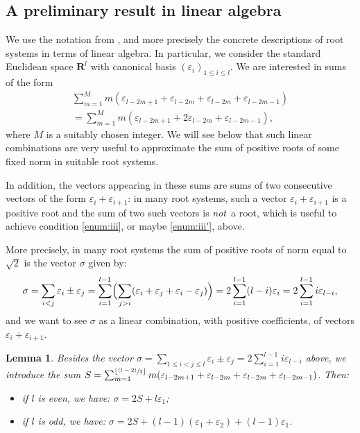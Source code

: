 \documentclass[JEP,XML,SOM,Unicode,published]{cedram}
\newcommand{\psfrac}[2]{\sfrac{(#1)}{#2}}
\newcommand{\RR}{\mathbf{R}}
\theoremstyle{plain}
\newtheorem{lemma}[equation]{Lemma}
\theoremstyle{remark}
\theoremstyle{definition}
\begin{document}
\subsection{A preliminary result in linear algebra}
\label{ss - linear algebra}
We use the notation from \cite[Planches]{BBK-Lie-4to6}, and more precisely the concrete descriptions of root systems in terms of linear algebra.
In particular, we consider the standard Euclidean space $\RR^l$ with canonical basis $(\varepsilon_i)_{1 \leqslant i \leqslant l}$.
We are interested in sums of the form\vspace*{-3pt}
\begin{multline*}
\sum_{m=1}^M m(\varepsilon_{l-2m+1} + \varepsilon_{l-2m} + \varepsilon_{l-2m} + \varepsilon_{l-2m-1})\\[-5pt]
= \sum_{m=1}^M m(\varepsilon_{l-2m+1} + 2\varepsilon_{l-2m} + \varepsilon_{l-2m-1}),
\end{multline*}
where $M$ is a suitably chosen integer.
We will see below that such linear combinations are very useful to approximate the sum of positive roots of some fixed norm in suitable root systems.

In addition, the vectors appearing in these sums are sums of two consecutive vectors of the form $\varepsilon_{i}+\varepsilon_{i+1}$: in many root systems, such a vector $\varepsilon_{i}+\varepsilon_{i+1}$ is a positive root and the sum of two such vectors is \emph{not}~a root, which is useful to achieve condition \eqref{enum:iii}, or maybe \eqref{enum:iii'}, above.

More precisely, in many root systems the sum of positive roots of norm equal to~$\sqrt{2}$ is the vector $\sigma$ given by:\vspace*{-3pt}
\[
\sigma =
\sum_{i<j} \varepsilon_i \pm \varepsilon_j
= \sum_{i=1}^{l-1} \Bigl(\sum_{j>i} (\varepsilon_i + \varepsilon_j + \varepsilon_i - \varepsilon_j) \Bigr)
= 2 \sum_{i=1}^{l-1} (l-i) \varepsilon_i
= 2 \sum_{i=1}^{l-1} i \varepsilon_{l-i},
\]
and we want to see $\sigma$ as a linear combination, with positive coefficients, of vectors $\varepsilon_{i}+\varepsilon_{i+1}$.

\begin{lemma}
\label{lemma - linear algebra}
Besides the vector $\sigma = \sum_{1 \leqslant i<j \leqslant l} \varepsilon_i \pm \varepsilon_j = 2 \sum_{i=1}^{l-1} i \varepsilon_{l-i}$ above, we introduce the sum
$S = \sum_{m=1}^{\lfloor \psfrac{l-2}{2} \rfloor} m(\varepsilon_{l-2m+1} + \varepsilon_{l-2m} + \varepsilon_{l-2m} + \varepsilon_{l-2m-1})$.
Then:
\begin{itemize}
\item
 if $l$ is even, we have: $\sigma = 2S + l \varepsilon_1$;
\item
if $l$ is odd, we have: $\sigma = 2S + (l-1) (\varepsilon_1 + \varepsilon_2) + (l-1) \varepsilon_1$.
\end{itemize}
\end{lemma}
\end{document}
